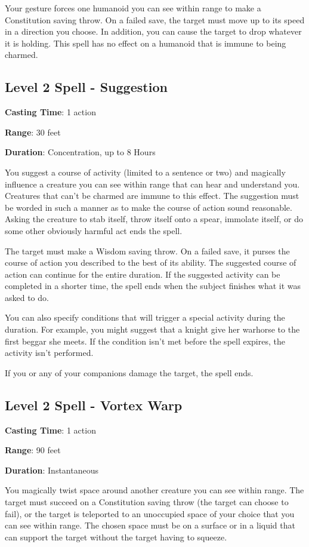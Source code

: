\documentclass{article}
\begin{document}
Your gesture forces one humanoid you can see within range to make a Constitution saving throw. On a failed save, the target must move up to its speed in a direction you choose. In addition, you can cause the target to drop whatever it is holding. This spell has no effect on a humanoid that is immune to being charmed.

\subsection{Level 2 Spell - Suggestion}
\noindent\textbf{Casting Time}: 1 action

\noindent\textbf{Range}: 30 feet

\noindent\textbf{Duration}: Concentration, up to 8 Hours

You suggest a course of activity (limited to a sentence or two) and magically influence a creature you can see within range that can hear and understand you. Creatures that can’t be charmed are immune to this effect. The suggestion must be worded in such a manner as to make the course of action sound reasonable. Asking the creature to stab itself, throw itself onto a spear, immolate itself, or do some other obviously harmful act ends the spell.

The target must make a Wisdom saving throw. On a failed save, it purses the course of action you described to the best of its ability. The suggested course of action can continue for the entire duration. If the suggested activity can be completed in a shorter time, the spell ends when the subject finishes what it was asked to do.

You can also specify conditions that will trigger a special activity during the duration. For example, you might suggest that a knight give her warhorse to the first beggar she meets. If the condition isn’t met before the spell expires, the activity isn’t performed.

If you or any of your companions damage the target, the spell ends.

\subsection{Level 2 Spell - Vortex Warp}
\noindent\textbf{Casting Time}: 1 action

\noindent\textbf{Range}: 90 feet

\noindent\textbf{Duration}: Instantaneous

You magically twist space around another creature you can see within range. The target must succeed on a Constitution saving throw (the target can choose to fail), or the target is teleported to an unoccupied space of your choice that you can see within range. The chosen space must be on a surface or in a liquid that can support the target without the target having to squeeze.
\end{document}
